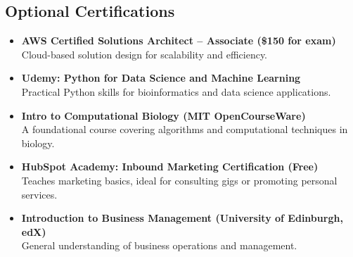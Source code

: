 \documentclass[11pt]{report}
\newcommand{\Paid}[1]{\colorbox{Paid}{#1}}
\newcommand{\Free}[1]{\colorbox{Free}{#1}}
\newcommand{\Trial}[1]{\colorbox{Trial}{#1}}
\begin{document}
\subsection*{Optional Certifications}
\begin{itemize}[label=$\Box$, leftmargin=2em]
	\item \Paid{\textbf{AWS Certified Solutions Architect – Associate (\$150 for exam)}}  \\
	Cloud-based solution design for scalability and efficiency.
	
	\item \Trial{\textbf{Udemy: Python for Data Science and Machine Learning}}  \\
	Practical Python skills for bioinformatics and data science applications.
	
	\item \Free{\textbf{Intro to Computational Biology (MIT OpenCourseWare)}}  \\
	A foundational course covering algorithms and computational techniques in biology.
	
	\item \Free{\textbf{HubSpot Academy: Inbound Marketing Certification (Free)}}  \\
	Teaches marketing basics, ideal for consulting gigs or promoting personal services.
	
	\item \Paid{\textbf{Introduction to Business Management (University of Edinburgh, edX)}}  \\
	General understanding of business operations and management.
\end{itemize}




	
\end{document}
